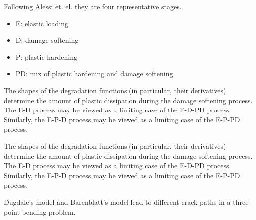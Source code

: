 \begin{frame}{}
Following Alessi et. el. they are four representative stages.
\begin{itemize}
  \item E: elastic loading
  \item D: damage softening
  \item P: plastic hardening
  \item PD: mix of plastic hardening and damage softening
\end{itemize}

\end{frame}

\begin{frame}{}
The shapes of the degradation functions (in particular, their derivatives) determine the amount of plastic dissipation during the damage softening process. \textcolor{dukeroyal}{The E-D process may be viewed as a limiting case of the E-D-PD process.} Similarly, the E-P-D process may be viewed as a limiting case of the E-P-PD process.

\end{frame}

\begin{frame}{}
The shapes of the degradation functions (in particular, their derivatives) determine the amount of plastic dissipation during the damage softening process. The E-D process may be viewed as a limiting case of the E-D-PD process. \textcolor{dukeroyal}{Similarly, the E-P-D process may be viewed as a limiting case of the E-P-PD process.}

\end{frame}

\begin{frame}{}
Dugdale's model and Barenblatt's model lead to different crack paths in a three-point bending problem.

\end{frame}
